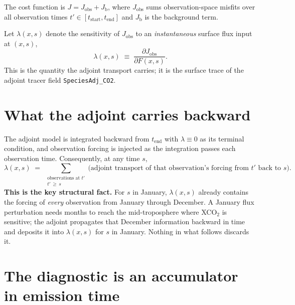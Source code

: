 \documentclass[12pt]{article}
\newcommand{\tend}{t_{\mathrm{end}}}
\newcommand{\tstart}{t_{\mathrm{start}}}
\begin{document}
The cost function is $J = J_{\mathrm{obs}} + J_{\mathrm{b}}$, where $J_{\mathrm{obs}}$
sums observation-space misfits over all observation times $t' \in [\tstart,\tend]$
and $J_{\mathrm{b}}$ is the background term.

Let $\lambda(x,s)$ denote the sensitivity of $J_{\mathrm{obs}}$ to an
\emph{instantaneous} surface flux input at $(x,s)$,
%
\begin{equation}
  \lambda(x,s) \;\equiv\; \frac{\partial J_{\mathrm{obs}}}{\partial F(x,s)} .
  \label{eq:lambda}
\end{equation}
%
This is the quantity the adjoint transport carries; it is the surface trace of the
adjoint tracer field \texttt{SpeciesAdj\_CO2}.

\section{What the adjoint carries backward}

The adjoint model is integrated backward from $\tend$ with $\lambda \equiv 0$ as its
terminal condition, and observation forcing is injected as the integration passes
each observation time. Consequently, at any time $s$,
%
\begin{equation}
  \lambda(x,s) \;=\; \sum_{\substack{\text{observations at } t' \\ t' \,\ge\, s}}
    \Big( \text{adjoint transport of that observation's forcing from } t' \text{ back to } s \Big).
  \label{eq:lambda_sum}
\end{equation}
%
\textbf{This is the key structural fact.} For $s$ in January, $\lambda(x,s)$ already
contains the forcing of \emph{every} observation from January through December. A
January flux perturbation needs months to reach the mid-troposphere where XCO$_2$
is sensitive; the adjoint propagates that December information backward in time
and deposits it into $\lambda(x,s)$ for $s$ in January. Nothing in what follows
discards it.

\section{The diagnostic is an accumulator in emission time}
\end{document}
